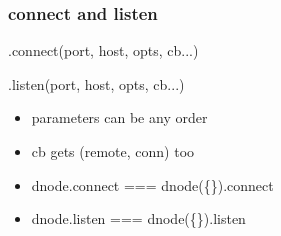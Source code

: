 \documentclass{beamer}
\begin{document}
\begin{frame}
    \frametitle{connect and listen}
    \large
    
    .connect(port, host, opts, cb...)
    
    .listen(port, host, opts, cb...)
    
    \begin{itemize}
    \item parameters can be any order
    \pause
    \item cb gets (remote, conn) too
    \pause
    \item dnode.connect === dnode(\{\}).connect
    \item dnode.listen === dnode(\{\}).listen
    \end{itemize}
\end{frame}
\end{document}
